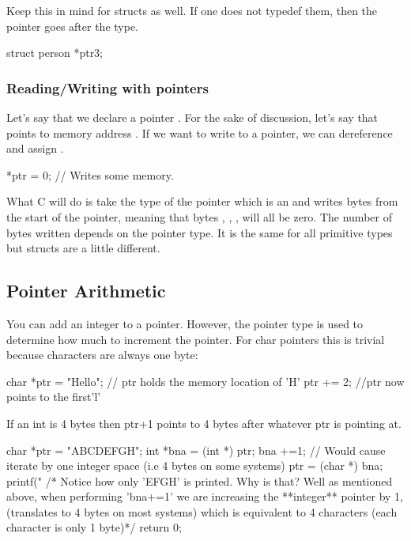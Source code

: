 Keep this in mind for structs as well. If one does not typedef them, then the pointer goes after the type.

\begin{code}[language=C]
struct person *ptr3;
\end{code}

\subsubsection{Reading/Writing with pointers}

Let's say that we declare a pointer . For the sake of
discussion, let's say that  points to memory address
. If we want to write to a pointer, we can dereference
and assign .

\begin{code}[language=C]
*ptr = 0; // Writes some memory.
\end{code}

What C will do is take the type of the pointer which is an 
and writes  bytes from the start of the pointer,
meaning that bytes , , ,
 will all be zero. The number of bytes written depends on
the pointer type. It is the same for all primitive types but structs are
a little different.

\subsection{Pointer Arithmetic}

You can add an integer to a pointer. However, the pointer type is used
to determine how much to increment the pointer. For char pointers this
is trivial because characters are always one byte:

\begin{code}[language=C]
char *ptr = "Hello"; // ptr holds the memory location of 'H'
ptr += 2; //ptr now points to the first'l'
\end{code}

If an int is 4 bytes then ptr+1 points to 4 bytes after whatever ptr is
pointing at.

\begin{code}[language=C]
char *ptr = "ABCDEFGH";
int *bna = (int *) ptr;
bna +=1; // Would cause iterate by one integer space (i.e 4 bytes on some systems)
ptr = (char *) bna;
printf("%
/* Notice how only 'EFGH' is printed. Why is that? Well as mentioned above, when performing 'bna+=1' we are increasing the **integer** pointer by 1, (translates to 4 bytes on most systems) which is equivalent to 4 characters (each character is only 1 byte)*/
return 0;
\end{code}

